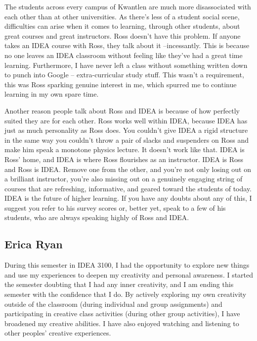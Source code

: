 \documentclass[letterpaper,10pt,headsepline]{scrreprt}
\begin{document}
The students across every campus of Kwantlen are much more disassociated with each other than at other
universities. As there's less of a student social scene, difficulties can
arise when it comes to learning, through other students, about great
courses and great instructors. Ross doesn't have this problem. If anyone
takes an IDEA course with Ross, they talk about it --incessantly. This is
because no one leaves an IDEA classroom without feeling like they've had a
great time learning. Furthermore, I have never left a class without
something written down to punch into Google -- extra-curricular study stuff.
This wasn't a requirement, this was Ross sparking genuine interest in me,
which spurred me to continue learning in my own spare time.

Another reason
people talk about Ross and IDEA is because of how perfectly suited they are
for each other. Ross works well within IDEA, because IDEA has just as much
personality as Ross does. You couldn't give IDEA a rigid structure in the
same way you couldn't throw a pair of slacks and suspenders on Ross and
make him speak a monotone physics lecture. It doesn't work like that. IDEA
is Ross' home, and IDEA is where Ross flourishes as an instructor. IDEA is
Ross and Ross is IDEA. Remove one from the other, and you're not only
losing out on a brilliant instructor, you're also missing out on a
genuinely engaging string of courses that are refreshing, informative, and
geared toward the students of today. IDEA is the future of higher learning.
If you have any doubts about any of this, I suggest you refer to his survey
scores or, better yet, speak to a few of his students, who are always
speaking highly of Ross and IDEA.

\subsection{Erica Ryan}

During this semester in IDEA 3100, I had the opportunity to explore new things and use my experiences to deepen my creativity and personal awareness. I started the semester doubting that I had any inner creativity, and I am ending this semester with the confidence that I do. By actively exploring my own creativity outside of the classroom (during individual and group assignments) and participating in creative class activities (during other group activities), I have broadened my creative abilities. I have also enjoyed watching and listening to other peoples’ creative experiences.
\end{document}

